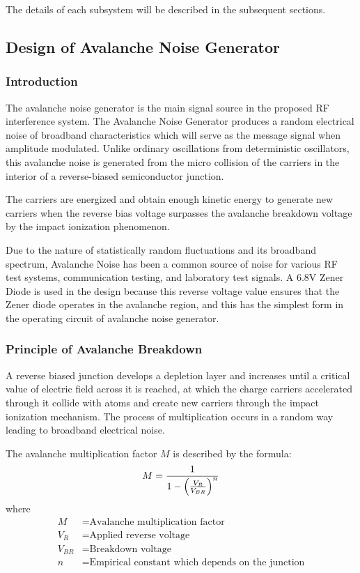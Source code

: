 \documentclass[12pt,a4paper]{report}
\begin{document}
	The details of each subsystem will be described in the subsequent sections.
	
	\subsection{Design of Avalanche Noise Generator}
	
	\subsubsection{Introduction}
	The avalanche noise generator is the main signal source in the proposed RF interference system. The Avalanche Noise Generator produces a random electrical noise of broadband characteristics which will serve as the message signal when amplitude modulated. Unlike ordinary oscillations from deterministic oscillators, this avalanche noise is generated from the micro collision of the carriers in the interior of a reverse-biased semiconductor junction.
	
	The carriers are energized and obtain enough kinetic energy to generate new carriers when the reverse bias voltage surpasses the avalanche breakdown voltage by the impact ionization phenomenon.
	
	Due to the nature of statistically random fluctuations and its broadband spectrum, Avalanche Noise has been a common source of noise for various RF test systems, communication testing, and laboratory test signals. A 6.8V Zener Diode is used in the design because this reverse voltage value ensures that the Zener diode operates in the avalanche region, and this has the simplest form in the operating circuit of avalanche noise generator.
	
	\subsubsection{Principle of Avalanche Breakdown}
	A reverse biased junction develops a depletion layer and increases until a critical value of electric field across it is reached, at which the charge carriers accelerated through it collide with atoms and create new carriers through the impact ionization mechanism. The process of multiplication occurs in a random way leading to broadband electrical noise.
	
	The avalanche multiplication factor $M$ is described by the formula:
	\begingroup
	\setlength{\mathindent}{0pt}
	\begin{equation*}
		\hfill
		M = \frac{1}{1 - \left(\frac{V_R}{V_{BR}}\right)^n}
		\hfill
	\end{equation*}
	\endgroup
	where
	\begin{align*}
		M &= \text{Avalanche multiplication factor} \\
		V_R &= \text{Applied reverse voltage} \\
		V_{BR} &= \text{Breakdown voltage} \\
		n &= \text{Empirical constant which depends on the junction}
	\end{align*}
	
\end{document}
